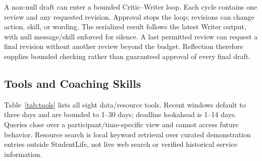 \documentclass{article}
\begin{document}
A non-null draft can enter a bounded Critic--Writer loop. Each cycle contains one review and any requested revision. Approval stops the loop; revisions can change action, skill, or wording. The serialized result follows the latest Writer output, with null message/skill enforced for silence. A last permitted review can request a final revision without another review beyond the budget. Reflection therefore supplies bounded checking rather than guaranteed approval of every final draft.

\subsection{Tools and Coaching Skills}
Table~\ref{tab:tools} lists all eight data/resource tools. Recent windows default to three days and are bounded to 1--30 days; deadline lookahead is 1--14 days. Queries close over a participant/time-specific view and cannot access future behavior. Resource search is local keyword retrieval over curated demonstration entries outside StudentLife, not live web search or verified historical service information.
\end{document}
